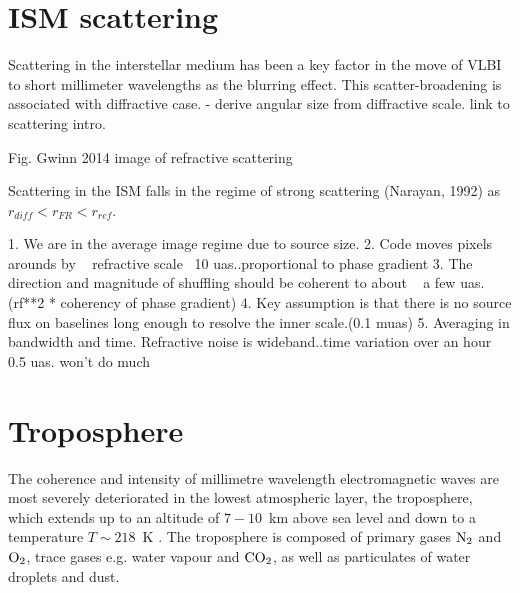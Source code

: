 \section{ISM scattering}

Scattering in the interstellar medium has been a key factor in the move of VLBI to short millimeter wavelengths as the blurring effect. This scatter-broadening is associated with diffractive case. - derive angular size from diffractive scale. link to scattering intro.

{Fig. Gwinn 2014 image of refractive scattering}

Scattering in the ISM falls in the regime of strong scattering (Narayan, 1992) as $r_{diff} < r_{FR} < r_{ref} $. 

1. We are in the average image regime due to source size.
2. Code moves pixels arounds by ~ refractive scale ~10 uas..proportional to phase gradient 
3. The direction and magnitude of shuffling should be coherent to about ~ a few uas. (rf**2 * coherency of phase gradient)
4. Key assumption is that there is no source flux on baselines long enough to resolve the inner scale.(0.1 muas)
5. Averaging in bandwidth and time. Refractive noise is wideband..time variation over an hour ~ 0.5 uas. won't do much
\section{Troposphere}

The coherence and intensity of millimetre wavelength electromagnetic waves are most severely deteriorated in the lowest atmospheric layer, the troposphere, which extends up to an altitude of $7-10$~km above sea level and down to a temperature $T \sim 218$~K \citep{Thompson_2001}. The troposphere is composed of primary gases $\rm N_2$ and  $\rm O_2$, trace gases e.g. water vapour and $\rm CO_2$, as well as particulates of water droplets and dust. 

